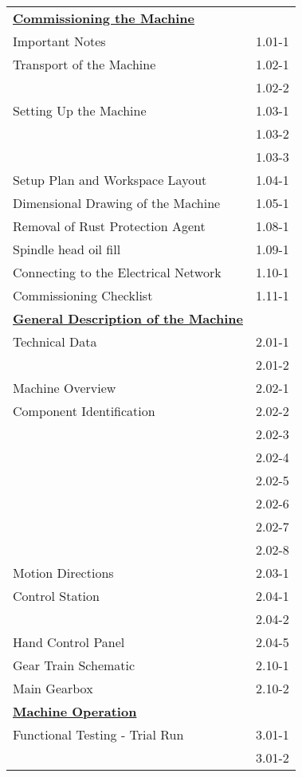 \begin{tabularx}{\textwidth}{X r}
    \textbf{\underline{Commissioning the Machine}} & \\ %
    Important Notes \dotfill & 1.01-1 \\
    Transport of the Machine \dotfill & 1.02-1 \\
     & 1.02-2 \\ %
    Setting Up the Machine \dotfill & 1.03-1 \\
     & 1.03-2 \\
     & 1.03-3 \\
    Setup Plan and Workspace Layout \dotfill & 1.04-1 \\
    Dimensional Drawing of the Machine \dotfill & 1.05-1 \\
    Removal of Rust Protection Agent \dotfill & 1.08-1 \\
    Spindle head oil fill \dotfill & 1.09-1 \\
    Connecting to the Electrical Network \dotfill & 1.10-1 \\
    Commissioning Checklist \dotfill & 1.11-1 \\[0.5cm]

    \textbf{\underline{General Description of the Machine}} & \\ %
    Technical Data \dotfill & 2.01-1 \\
     & 2.01-2 \\
    Machine Overview \dotfill & 2.02-1 \\
    Component Identification \dotfill & 2.02-2 \\
     & 2.02-3 \\
     & 2.02-4 \\
     & 2.02-5 \\
     & 2.02-6 \\
     & 2.02-7 \\
     & 2.02-8 \\
    Motion Directions \dotfill & 2.03-1 \\
    Control Station \dotfill & 2.04-1 \\
     & 2.04-2 \\
    Hand Control Panel \dotfill & 2.04-5 \\
    Gear Train Schematic \dotfill & 2.10-1 \\
    Main Gearbox \dotfill & 2.10-2 \\[0.5cm]

    \textbf{\underline{Machine Operation}} & \\
    Functional Testing - Trial Run \dotfill & 3.01-1 \\
     & 3.01-2 \\[0.5cm]
\end{tabularx}

